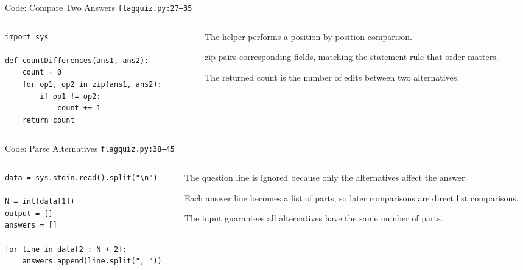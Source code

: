 \documentclass[aspectratio=169,11pt]{beamer}
\begin{document}
\begin{frame}[fragile]{Code: Compare Two Answers}
\scriptsize
{} \texttt{flagquiz.py:27--35}

\vspace{0.08cm}
\begin{columns}[T,totalwidth=\textwidth]
\begin{column}{0.58\textwidth}
\begin{lstlisting}[style=cpcode]
import sys

def countDifferences(ans1, ans2):
    count = 0
    for op1, op2 in zip(ans1, ans2):
        if op1 != op2:
            count += 1
    return count
\end{lstlisting}
\end{column}
\begin{column}{0.38\textwidth}
\begin{tightitemize}
  \item The helper performs a position-by-position comparison.
  \item zip pairs corresponding fields, matching the statement rule that order matters.
  \item The returned count is the number of edits between two alternatives.
\end{tightitemize}
\end{column}
\end{columns}
\end{frame}

\begin{frame}[fragile]{Code: Parse Alternatives}
\scriptsize
{} \texttt{flagquiz.py:38--45}

\vspace{0.08cm}
\begin{columns}[T,totalwidth=\textwidth]
\begin{column}{0.58\textwidth}
\begin{lstlisting}[style=cpcode]
data = sys.stdin.read().split("\n")

N = int(data[1])
output = []
answers = []

for line in data[2 : N + 2]:
    answers.append(line.split(", "))
\end{lstlisting}
\end{column}
\begin{column}{0.38\textwidth}
\begin{tightitemize}
  \item The question line is ignored because only the alternatives affect the answer.
  \item Each answer line becomes a list of parts, so later comparisons are direct list comparisons.
  \item The input guarantees all alternatives have the same number of parts.
\end{tightitemize}
\end{column}
\end{columns}
\end{frame}
\end{document}
